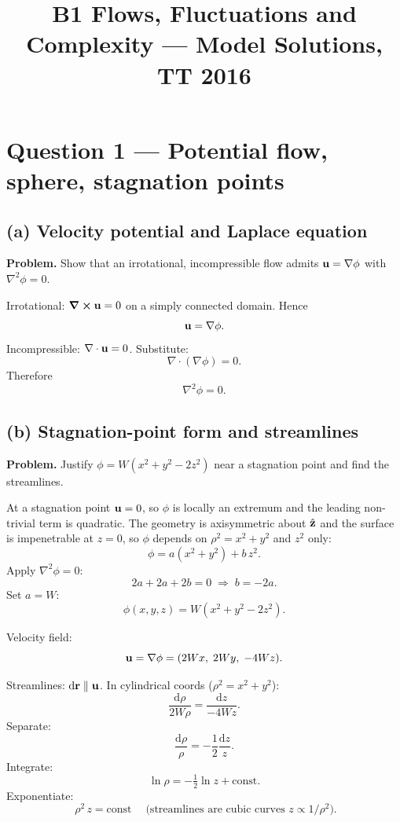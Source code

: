 \documentclass[11pt]{article}
\title{B1 Flows, Fluctuations and Complexity --- Model Solutions, TT 2016}
\author{}
\date{}
\newcommand{\de}{\mathrm{d}}
\newcommand{\Lap}{\nabla^{2}}
\begin{document}
\maketitle

\section*{Question 1 --- Potential flow, sphere, stagnation points}

\subsection*{(a) Velocity potential and Laplace equation}

\textbf{Problem.} Show that an irrotational, incompressible flow admits $\vb u = \nabla\phi$ with $\Lap\phi=0$.

Irrotational: $\curl\vb u = 0$ on a simply connected domain. Hence
\[ \vb u = \nabla\phi. \]
Incompressible: $\nabla\cdot\vb u = 0$. Substitute:
\[ \nabla\cdot(\nabla\phi) = 0. \]
Therefore
\[ \boxed{\;\Lap\phi = 0.\;} \]

\subsection*{(b) Stagnation-point form and streamlines}

\textbf{Problem.} Justify $\phi = W(x^2+y^2-2z^2)$ near a stagnation point and find the streamlines.

At a stagnation point $\vb u = 0$, so $\phi$ is locally an extremum and the leading non-trivial term is quadratic. The geometry is axisymmetric about $\hat{\vb z}$ and the surface is impenetrable at $z=0$, so $\phi$ depends on $\rho^2 = x^2+y^2$ and $z^2$ only:
\[ \phi = a(x^2+y^2) + b\,z^2. \]
Apply $\Lap\phi=0$:
\[ 2a + 2a + 2b = 0 \;\Rightarrow\; b = -2a. \]
Set $a = W$:
\[ \boxed{\;\phi(x,y,z) = W(x^2+y^2-2z^2).\;} \]

Velocity field:
\[ \vb u = \nabla\phi = (2Wx,\; 2Wy,\; -4Wz). \]

Streamlines: $\de\vb r \parallel \vb u$. In cylindrical coords ($\rho^2=x^2+y^2$):
\[ \frac{\de\rho}{2W\rho} = \frac{\de z}{-4Wz}. \]
Separate:
\[ \frac{\de\rho}{\rho} = -\frac{1}{2}\frac{\de z}{z}. \]
Integrate:
\[ \ln\rho = -\tfrac{1}{2}\ln z + \text{const}. \]
Exponentiate:
\[ \boxed{\;\rho^2\, z = \text{const}\;} \quad\text{(streamlines are cubic curves $z\propto 1/\rho^2$).} \]
\end{document}
